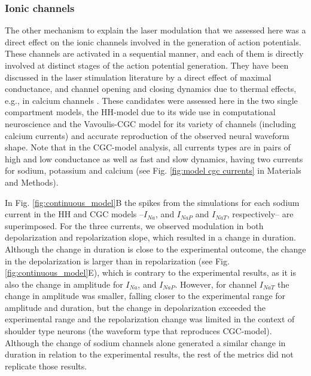 \subsubsection{Ionic channels}
The other mechanism to explain the laser modulation that we assessed here was a direct effect on the ionic channels involved in the generation of action potentials. These channels are activated in a sequential manner, and each of them is directly involved at distinct stages of the action potential generation. They have been discussed in the laser stimulation literature \parencite{liang_temperature-dependent_2009,li_temporal_2013, rabbitt_heat_2016} by a direct effect of maximal conductance, and channel opening and closing dynamics due to thermal effects, e.g., in calcium channels \parencite{albert_trpv4_2012, barrett_pulsed_2018}. These candidates were assessed here in the two single compartment models, the HH-model due to its wide use in computational neuroscience and the Vavoulis-CGC model for its variety of channels (including calcium currents) and accurate reproduction of the observed neural waveform shape. Note that in the CGC-model analysis, all currents types are in pairs of high and low conductance as well as fast and slow dynamics, having two currents for sodium, potassium and calcium (see Fig. \ref{fig:model cgc currents} in Materials and Methods).

In Fig. \ref{fig:continuous_model}B the spikes from the simulations for each sodium current in the HH and CGC models --$I_{Na}$, and $I_{NaP}$ and $I_{NaT}$, respectively-- are superimposed. For the three currents, we observed modulation in both depolarization and repolarization slope, which resulted in a change in duration. Although the change in duration is close to the experimental outcome, the change in the depolarization is larger than in repolarization (see Fig. \ref{fig:continuous_model}E), which is contrary to the experimental results, as it is also the change in amplitude for $I_{Na}$, and $I_{NaP}$. However, for channel $I_{NaT}$ the change in amplitude was smaller, falling closer to the experimental range for amplitude and duration, but the change in depolarization exceeded the experimental range and the repolarization change was limited in the context of shoulder type neurons (the waveform type that reproduces CGC-model). Although the change of sodium channels alone generated a similar change in duration in relation to the experimental results, the rest of the metrics did not replicate those results.

